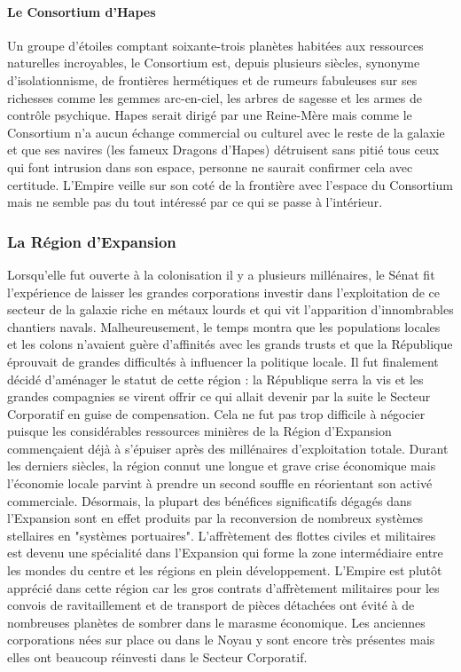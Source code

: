 \documentclass[twoside]{article}
\begin{document}
\paragraph{Le Consortium d'Hapes}
Un groupe d'étoiles comptant soixante-trois planètes habitées aux ressources naturelles incroyables, le Consortium est, depuis plusieurs siècles, synonyme d'isolationnisme, de frontières hermétiques et de rumeurs fabuleuses sur ses richesses comme les gemmes arc-en-ciel, les arbres de sagesse et les armes de contrôle psychique. Hapes serait dirigé par une Reine-Mère mais comme le Consortium n'a aucun échange commercial ou culturel avec le reste de la galaxie et que ses navires (les fameux Dragons d'Hapes) détruisent sans pitié tous ceux qui font intrusion dans son espace, personne ne saurait confirmer cela avec certitude. L'Empire veille sur son coté de la frontière avec l'espace du Consortium mais ne semble pas du tout intéressé par ce qui se passe à l'intérieur.

\subsubsection{La Région d'Expansion}
Lorsqu'elle fut ouverte à la colonisation il y a plusieurs millénaires, le Sénat fit l'expérience de laisser les grandes corporations investir dans l'exploitation de ce secteur de la galaxie riche en métaux lourds et qui vit l'apparition d'innombrables chantiers navals. Malheureusement, le temps montra que les populations locales et les colons n'avaient guère d'affinités avec les grands trusts et que la République éprouvait de grandes difficultés à influencer la politique locale. Il fut finalement décidé d'aménager le statut de cette région : la République serra la vis et les grandes compagnies se virent offrir ce qui allait devenir par la suite le Secteur Corporatif en guise de compensation. Cela ne fut pas trop difficile à négocier puisque les considérables ressources minières de la Région d'Expansion commençaient déjà à s'épuiser après des millénaires d'exploitation totale. Durant les derniers siècles, la région connut une longue et grave crise économique mais l'économie locale parvint à prendre un second souffle en réorientant son activé commerciale. Désormais, la plupart des bénéfices significatifs dégagés dans l'Expansion sont en effet produits par la reconversion de nombreux systèmes stellaires en  "systèmes portuaires". L'affrètement des flottes civiles et militaires est devenu une spécialité dans l'Expansion qui forme la zone intermédiaire entre les mondes du centre et les régions en plein développement. L'Empire est plutôt apprécié dans cette région car les gros contrats d'affrètement militaires pour les convois de ravitaillement et de transport de pièces détachées ont évité à de nombreuses planètes de sombrer dans le marasme économique. Les anciennes corporations nées sur place ou dans le Noyau y sont encore très présentes mais elles ont beaucoup réinvesti dans le Secteur Corporatif.
\end{document}
